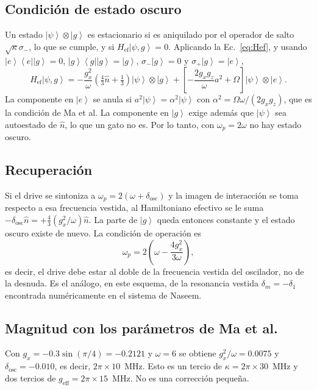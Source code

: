 \documentclass[11pt]{report}
\newcommand{\ket}[1]{\left|#1\right\rangle}
\newcommand{\bra}[1]{\left\langle#1\right|}
\newcommand{\spl}{\sigma_{+}}
\newcommand{\smi}{\sigma_{-}}
\newcommand{\Pe}{\ket{e}\!\bra{e}}
\newcommand{\Pg}{\ket{g}\!\bra{g}}
\begin{document}
\subsection{Condici\'on de estado oscuro}

Un estado $\ket{\psi}\otimes\ket{g}$ es estacionario si es aniquilado por el operador de salto $\sqrt{\kappa}\smi$, lo que se cumple, y si $H_{\mathrm{ef}}\ket{\psi,g}=0$. Aplicando la Ec.~\eqref{eq:Hef}, y usando $\Pe\ket{g}=0$, $\Pg\ket{g}=\ket{g}$, $\smi\ket{g}=0$ y $\spl\ket{g}=\ket{e}$,
\begin{equation}
H_{\mathrm{ef}}\ket{\psi,g} = -\frac{g_{x}^{2}}{\omega}\left(\tfrac{4}{3}\hat n+\tfrac{1}{3}\right)\ket{\psi}\otimes\ket{g} + \left[-\frac{2g_{x}g_{z}}{\omega}a^{2}+\Omega\right]\ket{\psi}\otimes\ket{e}.
\end{equation}
La componente en $\ket{e}$ se anula si $a^{2}\ket{\psi}=\alpha^{2}\ket{\psi}$ con $\alpha^{2}=\Omega\omega/(2g_{x}g_{z})$, que es la condici\'on de Ma et al. La componente en $\ket{g}$ exige adem\'as que $\ket{\psi}$ sea autoestado de $\hat n$, lo que un gato no es. Por lo tanto, con $\omega_{p}=2\omega$ no hay estado oscuro.

\subsection{Recuperaci\'on}

Si el drive se sintoniza a $\omega_{p}=2(\omega+\delta_{\mathrm{osc}})$ y la imagen de interacci\'on se toma respecto a esa frecuencia vestida, al Hamiltoniano efectivo se le suma $-\delta_{\mathrm{osc}}\hat n=+\tfrac{4}{3}(g_{x}^{2}/\omega)\hat n$. La parte de $\ket{g}$ queda entonces constante y el estado oscuro existe de nuevo. La condici\'on de operaci\'on es
\begin{equation}
\boxed{\omega_{p} = 2\left(\omega - \frac{4g_{x}^{2}}{3\omega}\right)},
\end{equation}
es decir, el drive debe estar al doble de la frecuencia vestida del oscilador, no de la desnuda. Es el an\'alogo, en este esquema, de la resonancia vestida $\delta_{m}=-\delta_{1}$ encontrada num\'ericamente en el sistema de Naseem.

\subsection{Magnitud con los par\'ametros de Ma et al.}

Con $g_{x}=-0.3\sin(\pi/4)=-0.2121$ y $\omega=6$ se obtiene $g_{x}^{2}/\omega=0.0075$ y $\delta_{\mathrm{osc}}=-0.010$, es decir, $2\pi\times10$~MHz. Esto es un tercio de $\kappa=2\pi\times30$~MHz y dos tercios de $g_{\mathrm{eff}}=2\pi\times15$~MHz. No es una correcci\'on peque\~na.
\end{document}
